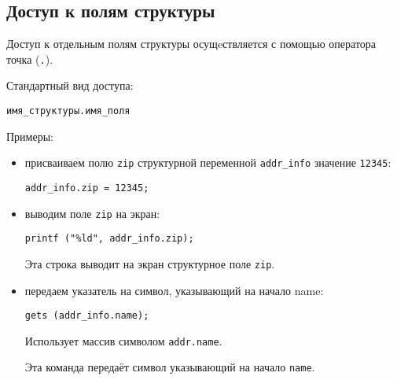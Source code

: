 \subsection{Доступ к полям структуры}

Доступ к отдельным полям структуры осущeствляется с помощью оператора точка (\texttt{.}).

Стандартный вид доступа:

\begin{verbatim}
имя_структуры.имя_поля
\end{verbatim}

Примеры: 
\begin{itemize}
\item присваиваем полю \texttt{zip} структурной переменной \texttt{addr\_info} значение \texttt{12345}: 
    \begin{verbatim}
addr_info.zip = 12345;
    \end{verbatim}

\item выводим поле \texttt{zip} на экран: 
    \begin{verbatim}
printf ("%ld", addr_info.zip);
    \end{verbatim}

    Эта строка выводит на экран структурное поле \texttt{zip}.

\item передаем указатель на символ, указывающий на начало name: 
    \begin{verbatim}
gets (addr_info.name);
    \end{verbatim}
  
    Использует массив символом \texttt{addr.name}.
  
    Эта команда передаёт символ указывающий на начало \texttt{name}.
\end{itemize}